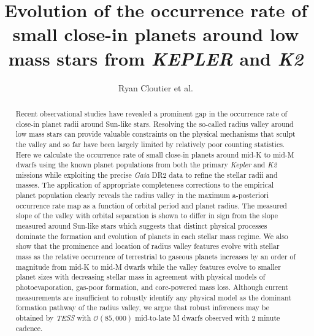 \documentclass[twocolumn]{emulateapj}
\newcommand{\gaia}[1]{\emph{Gaia}#1}
\newcommand{\kepler}[1]{\emph{Kepler}#1}
\newcommand{\ktwo}[1]{\emph{K2}#1}
\newcommand{\tess}[1]{\emph{TESS}#1}
\begin{document}
\title{Evolution of the occurrence rate of small close-in planets around low mass stars from \emph{KEPLER} and \emph{K2}}
\author{Ryan Cloutier et al.}



\begin{abstract}
  Recent observational studies have revealed a prominent gap in the occurrence rate
  of close-in planet radii around Sun-like stars.
  Resolving the so-called radius valley around low mass stars can provide valuable
  constraints on the physical mechanisms that sculpt the valley and so far have been largely limited
  by relatively poor counting statistics.
  Here we calculate the occurrence rate of small close-in planets around mid-K to mid-M dwarfs
  using the known planet populations from both the primary \kepler{} and \ktwo{} missions while
  exploiting the precise \gaia{} DR2 data to refine the stellar radii and masses. 
  The application of appropriate completeness corrections to the empirical planet population
  clearly reveals the radius valley in the maximum a-posteriori occurrence rate map as a
  function of orbital period and planet radius. The measured slope of the valley with orbital separation
  is shown to differ in sign from the slope measured around Sun-like stars which suggests that
  distinct physical processes dominate the formation and evolution of planets in each stellar mass regime.
  We also show that the prominence and location of radius valley features evolve with stellar mass as
  the relative occurrence of terrestrial to gaseous planets increases by an order of magnitude from mid-K to
  mid-M dwarfs while the valley features evolve to smaller
  planet sizes with decreasing stellar mass in agreement with physical models of photoevaporation,
  gas-poor formation, and core-powered mass loss. Although current measurements are
  insufficient to robustly identify any physical model as the dominant formation pathway of the radius valley,
  we argue that robust inferences may be obtained by \tess{} with $\mathcal{O}(85,000)$
  mid-to-late M dwarfs observed with 2 minute cadence.
\end{abstract}
\end{document}
